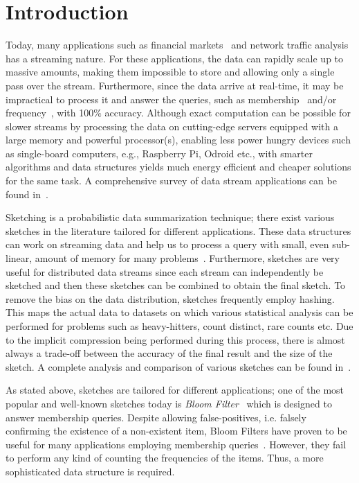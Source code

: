 \documentclass[10pt, conference, compsocconf]{IEEEtran}
\begin{document}
    \section{Introduction}
    
   Today, many applications such as financial markets~\cite{chandramouli2010} and network traffic analysis~\cite{fan1998,duffield2001} has a streaming nature. For these applications, the data can rapidly scale up to massive amounts, making them impossible to store and allowing only a single pass over the stream.  Furthermore, since the data arrive at real-time, it may be impractical to process it and answer the queries, such as membership~\cite{brodnik1999} and/or frequency~\cite{charikar2002}, with 100$\%$ accuracy. Although exact computation can be possible for slower streams by processing the data on cutting-edge servers equipped with a large memory and powerful processor(s), enabling less power hungry devices such as single-board computers, e.g., Raspberry Pi, Odroid etc., with smarter algorithms and data structures yields much energy efficient and cheaper solutions for the same task. A comprehensive survey of data stream applications can be found in~\cite{muthukrishnan2005}. 
      
Sketching is a probabilistic data summarization technique; there exist various sketches in the literature tailored for different applications. These data structures can work on streaming data and help us to process a query with small, even sub-linear, amount of memory for many problems~\cite{alon1996,charikar2002,dobra2002,gilbert2002}. Furthermore, sketches are very useful for distributed data streams since each stream can independently be sketched and then these sketches can be combined to obtain the final sketch. To remove the bias on the data distribution, sketches frequently employ hashing. This maps the actual data to datasets on which various statistical analysis can be performed for problems such as heavy-hitters, count distinct, rare counts etc. Due to the implicit compression being performed during this process, there is almost always a trade-off between the accuracy of the final result and the size of the sketch. A complete analysis and comparison of various sketches can be found in~\cite{cormode2005}.
	  
As stated above, sketches are tailored for different applications; one of the most popular and well-known sketches today is {\it Bloom Filter}~\cite{bloom1970} which is designed to answer membership queries. Despite allowing false-positives, i.e. falsely confirming the existence of a non-existent item, Bloom Filters have proven to be useful for many applications employing membership queries~\cite{broder2002}. However, they fail to perform any kind of counting the frequencies of the items. Thus, a more sophisticated data structure is required.
\end{document}
